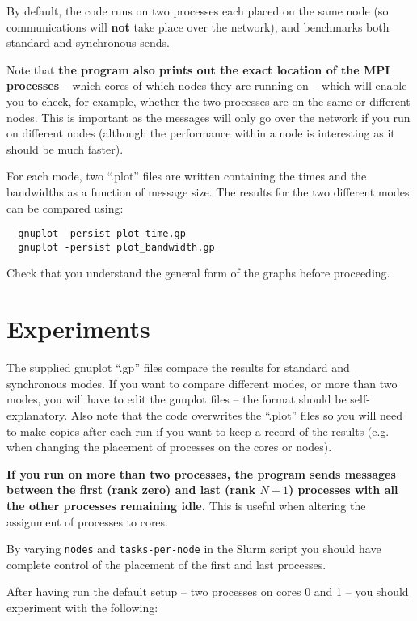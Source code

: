 \documentclass{article}
\begin{document}
By default, the code runs on two processes each placed on the same
node (so communications will {\bf not} take place over the network),
and benchmarks both standard and synchronous sends.

Note that {\bf the program also prints out the exact location of the
  MPI processes} -- which cores of which nodes they are running on --
which will enable you to check, for example, whether the two processes
are on the same or different nodes. This is important as the messages
will only go over the network if you run on different nodes (although
the performance within a node is interesting as it should be much
faster).

For each mode, two ``.plot'' files are written containing the times and
the bandwidths as a function of message size. The results for the two
different modes can be compared using:

\begin{verbatim}
  gnuplot -persist plot_time.gp
  gnuplot -persist plot_bandwidth.gp
\end{verbatim}

Check that you understand the general form of the graphs before
proceeding.

\section{Experiments}

The supplied gnuplot ``.gp'' files compare the results for standard and
synchronous modes. If you want to compare different modes, or more than
two modes, you will have to edit the gnuplot files -- the format should
be self-explanatory. Also note that the code overwrites the ``.plot''
files so you will need to make copies after each run if you want to keep
a record of the results (e.g. when changing the placement of processes
on the cores or nodes).

{\bf If you run on more than two processes, the program sends messages
  between the first (rank zero) and last (rank $N-1$) processes with
  all the other processes remaining idle.} This is useful when
altering the assignment of processes to cores.

By varying \verb+nodes+ and \verb+tasks-per-node+ in the Slurm script
you should have complete control of the placement of the first and
last processes.

After having run the default setup -- two processes on cores 0 and 1
-- you should experiment with the following:
\end{document}
